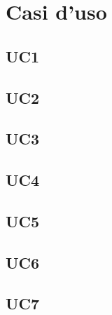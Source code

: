 \chapter{Casi d'uso}

\section{UC1}

\section{UC2}

\section{UC3}

\section{UC4}

\section{UC5}

\section{UC6}

\section{UC7}